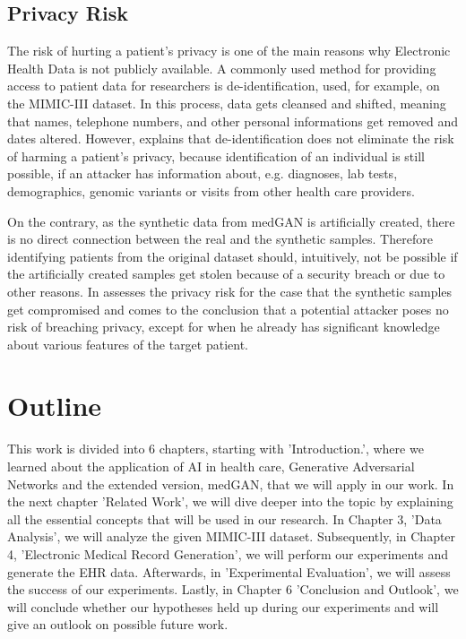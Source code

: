 \documentclass[11pt, a4paper]{book}
\begin{document}
\subsection{Privacy Risk}
The risk of hurting a patient's privacy is one of the main reasons why Electronic Health Data is not publicly available. A commonly used method for providing access to patient data for researchers is de-identification, used, for example, on the MIMIC-III dataset. In this process, data gets cleansed and shifted, meaning that names, telephone numbers, and other personal informations get removed and dates altered. \cite{johnson2016mimic}
However, \cite{Choi2017} explains that de-identification does not eliminate the risk of harming a patient's privacy, because identification of an individual is still possible, if an attacker has information about, e.g. diagnoses, lab tests, demographics, genomic variants or visits from other health care providers.

On the contrary, as the synthetic data from medGAN is artificially created, there is no direct connection between the real and the synthetic samples. Therefore identifying patients from the original dataset should, intuitively, not be possible if the artificially created samples get stolen because of a security breach or due to other reasons. In \cite{Choi2017} assesses the privacy risk for the case that the synthetic samples get compromised and comes to the conclusion that a potential attacker poses no risk of breaching privacy, except for when he already has significant knowledge about various features of the target patient.

\section{Outline}
This work is divided into 6 chapters, starting with 'Introduction.', where we learned about the application of AI in health care, Generative Adversarial Networks and the extended version, medGAN, that we will apply in our work. In the next chapter 'Related Work', we will dive deeper into the topic by explaining all the essential concepts that will be used in our research. In Chapter 3,  'Data Analysis', we will analyze the given MIMIC-III dataset. Subsequently, in Chapter 4, 'Electronic Medical Record Generation', we will perform our experiments and generate the EHR data. Afterwards, in 'Experimental Evaluation', we will assess the success of our experiments. Lastly, in Chapter 6 'Conclusion and Outlook', we will conclude whether our hypotheses held up during our experiments and will give an outlook on possible future work.
\end{document}

